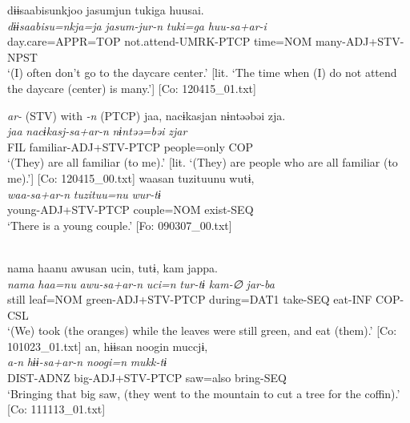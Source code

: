 \ex \label{ex:9.46e} %
\glll {\textbar}dɨɨsaabisu{\textbar}nkjoo  jasumjun  tukiga  huusai.\\
      \textit{dɨɨsaabisu=nkja=ja}  \textit{jasum-jur-n}  \textit{tuki=ga}  \textit{huu-sa+ar-i}\\
      day.care=APPR=TOP  not.attend-UMRK-PTCP  time=NOM   many-ADJ+STV-NPST\\      
      \glt ‘(I) often don’t go to the daycare center.’ [lit. ‘The time when (I) do not attend the daycare (center) is many.’]    [Co: 120415\_01.txt]

\exi{} \textit{ar-} (STV) with \textit{{}-n} (PTCP)
\ex\label{ex:9.46f} %
  \glll  jaa,  nacɨkasjan  nɨntəəbəi  zja.\\
      \textit{jaa}  \textit{nacɨkasj-sa+ar-n}  \textit{nɨntəə=bəi}  \textit{zjar}\\
      FIL  familiar-ADJ+STV-PTCP  people=only  COP\\
      \glt       ‘(They) are all familiar (to me).’ [lit. ‘(They) are people who are all familiar (to me).’] [Co: 120415\_00.txt]
\ex\label{ex:9.46g}%
\glll  waasan  tuzituunu  wutɨ,\\
      \textit{waa-sa+ar-n}  \textit{tuzituu=nu}  \textit{wur-tɨ}\\
      young-ADJ+STV-PTCP  couple=NOM  exist-SEQ\\
      \glt       ‘There is a young couple.’ [Fo: 090307\_00.txt]

\ex{}\\
    \glll  nama  haanu  awusan  ucin,  tutɨ,  kam  jappa.\\
      \textit{nama}  \textit{haa=nu}  \textit{awu-sa+ar-n}  \textit{uci=n}  \textit{tur-tɨ}  \textit{kam-∅}  \textit{jar-ba}\\
      still  leaf=NOM  green-ADJ+STV-PTCP  during=DAT1  take-SEQ  eat-INF  COP-CSL\\
      \glt       ‘(We) took (the oranges) while the leaves were still green, and eat (them).’ [Co: 101023\_01.txt]
\ex %
\glll an,  hɨɨsan  noogin  muccjɨ,\\
      \textit{a-n}  \textit{hɨɨ-sa+ar-n}  \textit{noogi=n}  \textit{mukk-tɨ}\\
      DIST-ADNZ  big-ADJ+STV-PTCP  saw=also  bring-SEQ\\
      \glt       ‘Bringing that big saw, (they went to the mountain to cut a tree for the coffin).’ [Co: 111113\_01.txt]
    \z
\z

